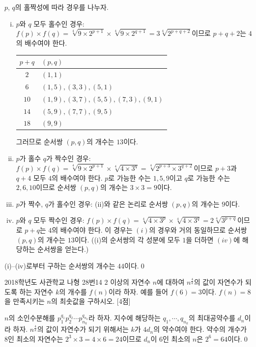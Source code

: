 \documentclass{article}
\begin{document}
\begin{sol}
	$p$, $q$의 홀짝성에 따라 경우를 나누자.
	\begin{enumerate}[(i)]
		\item $p$와 $q$ 모두 홀수인 경우: $f(p)\times f(q)=\sqrt[4]{9\times 2^{p+1}}\times\sqrt[4]{9\times 2^{q+1}}=3\sqrt[4]{2^{p+q+2}}$이므로 $p+q+2$는 $4$의 배수여야 한다.
			\begin{table}[H]
				\centering
				\begin{tabular}{c|l}
					\toprule
					$p+q$ & $(p,q)$ \\
					\midrule
					$2$ & $(1,1)$ \\
					\midrule
					$6$ & $(1,5),(3,3),(5,1)$ \\
					\midrule
					$10$ & $(1,9),(3,7),(5,5),(7,3),(9,1)$ \\
					\midrule
					$14$ & $(5,9),(7,7),(9,5)$ \\
					\midrule
					$18$ & $(9,9)$ \\
					\bottomrule
				\end{tabular}
			\end{table}
			그러므로 순서쌍 $(p,q)$의 개수는 $13$이다.
		\item $p$가 홀수 $q$가 짝수인 경우: $f(p)\times f(q)=\sqrt[4]{9\times 2^{p+1}}\times\sqrt[4]{4\times 3^q}=\sqrt[4]{2^{p+3}\times 3^{q+2}}$이므로 $p+3$과 $q+4$ 모두 $4$의 배수여야 한다. $p$로 가능한 수는 $1,5,9$이고 $q$로 가능한 수는 $2,6,10$이므로 순서쌍 $(p,q)$의 개수는 $3\times3=9$이다.
		\item $p$가 짝수, $q$가 홀수인 경우: (ii)와 같은 논리로 순서쌍 $(p,q)$의 개수는 $9$이다.
		\item $p$와 $q$ 모두 짝수인 경우: $f(p)\times f(q)=\sqrt[4]{4\times 3^p}\times\sqrt[4]{4\times 3^q}=2\sqrt[4]{3^{p+q}}$이므로 $p+q$는 $4$의 배수여야 한다. 이 경우는 $(i)$의 경우와 거의 동일하므로 순서쌍 $(p,q)$의 개수는 $13$이다. ((i)의 순서쌍의 각 성분에 모두 $1$을 더하면 $(iv)$에 해당하는 순서쌍을 얻는다.)
	\end{enumerate}
	(i)--(iv)로부터 구하는 순서쌍의 개수는 $44$이다.\qed
\end{sol}

\newpage
\begin{prob}{2018학년도 사관학교 나형 28번}{14}
	$2$ 이상의 자연수 $n$에 대하여 $n^{\frac{4}{k}}$의 값이 자연수가 되도록 하는 자연수 $k$의 개수를 $f(n)$이라 하자. 예를 들어 $f(6)=3$이다. $f(n)=8$을 만족시키는 $n$의 최솟값을 구하시오. [4점]
\end{prob}

\begin{sol}
	$n$의 소인수분해를 $p_1^{q_1}p_2^{q_2}\cdots p_{n_k}^{q_{n_k}}$라 하자. 지수에 해당하는 $q_1,\cdots, q_{n_k}$의 최대공약수를 $d_n$이라 하자. $n^\frac{4}{k}$의 값이 자연수가 되기 위해서는 $k$가 $4d_n$의 약수여야 한다. 약수의 개수가 $8$인 최소의 자연수는 $2^3\times3=4\times 6=24$이므로 $d_n$이 $6$인 최소의 $n$은 $2^6=64$이다.\qed
\end{sol}
\end{document}
